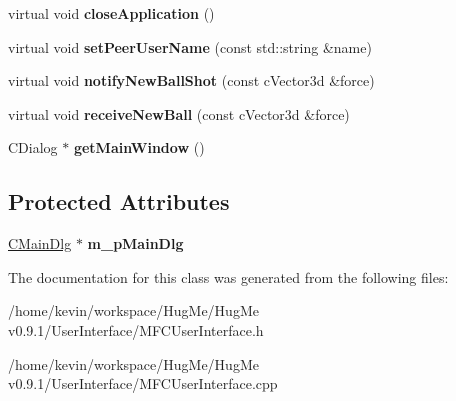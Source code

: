 \begin{DoxyCompactItemize}
\item 
\hypertarget{classMFCUserInterface_a0953b5a6a8880539f48e33828e1ebdac}{
virtual void {\bfseries closeApplication} ()}
\label{classMFCUserInterface_a0953b5a6a8880539f48e33828e1ebdac}

\item 
\hypertarget{classMFCUserInterface_a37ad511facfb8e5b6f34059a3ebf9f57}{
virtual void {\bfseries setPeerUserName} (const std::string \&name)}
\label{classMFCUserInterface_a37ad511facfb8e5b6f34059a3ebf9f57}

\item 
\hypertarget{classMFCUserInterface_afbd06e08b7e16ff1df6df06cdd3429e5}{
virtual void {\bfseries notifyNewBallShot} (const cVector3d \&force)}
\label{classMFCUserInterface_afbd06e08b7e16ff1df6df06cdd3429e5}

\item 
\hypertarget{classMFCUserInterface_aa592d72e4c2e6e482f363ce69b46250f}{
virtual void {\bfseries receiveNewBall} (const cVector3d \&force)}
\label{classMFCUserInterface_aa592d72e4c2e6e482f363ce69b46250f}

\item 
\hypertarget{classMFCUserInterface_a03a72e69e2586b52ba3acac1e6b39700}{
CDialog $\ast$ {\bfseries getMainWindow} ()}
\label{classMFCUserInterface_a03a72e69e2586b52ba3acac1e6b39700}

\end{DoxyCompactItemize}
\subsection*{Protected Attributes}
\begin{DoxyCompactItemize}
\item 
\hypertarget{classMFCUserInterface_a548760ec3e8f659b262ef3aab3709e7f}{
\hyperlink{classCMainDlg}{CMainDlg} $\ast$ {\bfseries m\_\-pMainDlg}}
\label{classMFCUserInterface_a548760ec3e8f659b262ef3aab3709e7f}

\end{DoxyCompactItemize}


The documentation for this class was generated from the following files:\begin{DoxyCompactItemize}
\item 
/home/kevin/workspace/HugMe/HugMe v0.9.1/UserInterface/MFCUserInterface.h\item 
/home/kevin/workspace/HugMe/HugMe v0.9.1/UserInterface/MFCUserInterface.cpp\end{DoxyCompactItemize}
